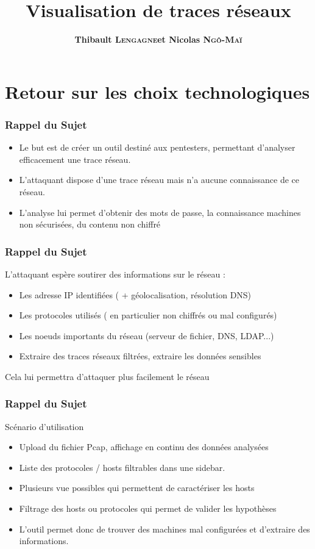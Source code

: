 \documentclass{beamer}
\title[Visualisation de traces réseaux]{Visualisation de traces réseaux}
\author{\textbf{Thibault \textsc{Lengagne}et Nicolas \textsc{Ngô-Maï}}}
\institute{Centrale Supélec - Campus de Rennes}
\begin{document}
  \begin{frame}
    \titlepage
  \end{frame}
  

 \section{Retour sur les choix technologiques}
  \begin{frame}
    \frametitle{Rappel du Sujet}
    \begin{itemize}
     \item Le but est de créer un outil destiné aux pentesters, permettant d'analyser efficacement une trace réseau.
     \item L'attaquant dispose d'une trace réseau mais n'a aucune connaissance de ce réseau.
     \item L'analyse lui permet d'obtenir des mots de passe, la connaissance machines non sécurisées, du contenu non chiffré
    \end{itemize}
  \end{frame}
  
   \begin{frame}
    \frametitle{Rappel du Sujet}
    L'attaquant espère soutirer des informations sur le réseau :
    \begin{itemize}
      \item Les adresse IP identifiées ( + géolocalisation, résolution DNS)
      \item Les protocoles utilisés ( en particulier non chiffrés ou mal configurés)
      \item Les noeuds importants du réseau (serveur de fichier, DNS, LDAP...)
      \item Extraire des traces réseaux filtrées, extraire les données sensibles
    \end{itemize}
    Cela lui permettra d'attaquer plus facilement le réseau
  \end{frame}
  
  \begin{frame}
  \frametitle{Rappel du Sujet}
    Scénario d'utilisation
    \begin{itemize}
     \item Upload du fichier Pcap, affichage en continu des données analysées
     \item Liste des protocoles / hosts filtrables dans une sidebar.
     \item Plusieurs vue possibles qui permettent de caractériser les hosts
     \item Filtrage des hosts ou protocoles qui permet de valider les hypothèses
     \item L'outil permet donc de trouver des machines mal configurées et d'extraire des informations.
    \end{itemize}
  \end{frame}
\end{document}
